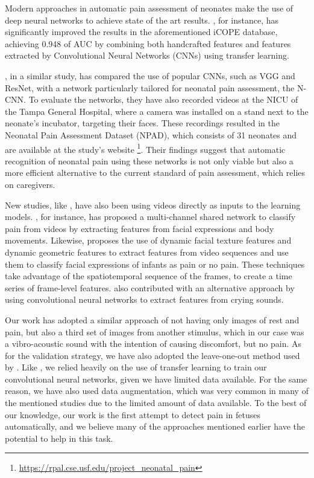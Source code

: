 Modern approaches in automatic pain assessment of neonates make the use of deep neural networks to achieve state of the art results. \cite{abs-1807-01631}, for instance, has significantly improved the results in the aforementioned iCOPE database, achieving 0.948 of AUC by combining both handcrafted features and features extracted by Convolutional Neural Networks (CNNs) using transfer learning.  

\cite{Zamzmi2019}, in a similar study, has compared the use of popular CNNs, such as VGG and ResNet, with a network particularly tailored for neonatal pain assessment, the N-CNN. To evaluate the networks, they have also recorded videos at the NICU of the Tampa General Hospital, where a camera was installed on a stand next to the neonate's incubator, targeting their faces. These recordings resulted in the Neonatal Pain Assessment Dataset (NPAD), which consists of 31 neonates and are available at the study's website \footnote{\url{https://rpal.cse.usf.edu/project\_neonatal\_pain}}. Their findings suggest that automatic recognition of neonatal pain using these networks is not only viable but also a more efficient alternative to the current standard of pain assessment, which relies on caregivers.

New studies, like \cite{Fotiadou2014}, have also been using videos directly as inputs to the learning models. \cite{SalekinZGKH019}, for instance, has proposed a multi-channel shared network to classify pain from videos by extracting features from facial expressions and body movements. Likewise, \citep{Zhi2018b} proposes the use of dynamic facial texture features and dynamic geometric features to extract features from video sequences and use them to classify facial expressions of infants as pain or no pain. These techniques take advantage of the spatiotemporal sequence of the frames, to create a time series of frame-level features. \citep{abs-1909-02543} also contributed with an alternative approach by using convolutional neural networks to extract features from crying sounds. 

Our work has adopted a similar approach of not having only images of rest and pain, but also a third set of images from another stimulus, which in our case was a vibro-acoustic sound with the intention of causing discomfort, but no pain. As for the validation strategy, we have also adopted the leave-one-out method used by \cite{Brahnam2006}. Like \cite{abs-1807-01631}, we relied heavily on the use of transfer learning to train our convolutional neural networks, given we have limited data available. For the same reason, we have also used data augmentation, which was very common in many of the mentioned studies due to the limited amount of data available. To the best of our knowledge, our work is the first attempt to detect pain in fetuses automatically, and we believe many of the approaches mentioned earlier have the potential to help in this task. 